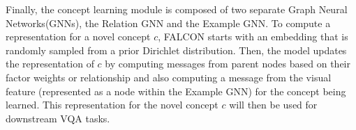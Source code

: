 Finally, the concept learning module is composed of two separate Graph Neural Networks(GNNs), the Relation GNN and the Example GNN.
To compute a representation for a novel concept $c$, FALCON starts with an embedding that is randomly sampled from a prior Dirichlet distribution.
Then, the model updates the representation of $c$ by computing messages from parent nodes based on their factor weights or relationship and also computing a message from the visual feature (represented as a node within the Example GNN) for the concept being learned.  
This representation for the novel concept $c$ will then be used for downstream VQA tasks. 


